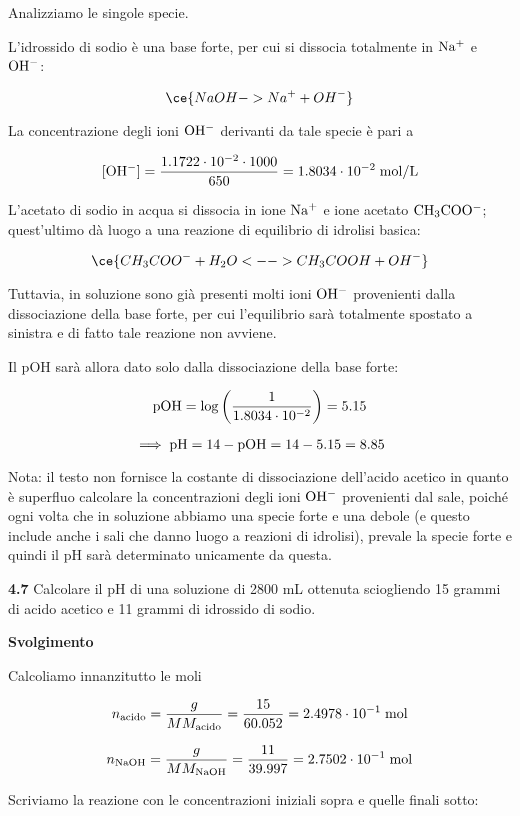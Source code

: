 Analizziamo le singole specie.

L'idrossido di sodio è una base forte, per cui si dissocia totalmente in $\rm Na^+$ e $\rm OH^-$:

$$\ce{NaOH -> Na^+ + OH^-}$$

La concentrazione degli ioni $\rm OH^-$ derivanti da tale specie è pari a

$$[\rm OH^-]=\frac{1.1722 \cdot 10^{-2} \cdot 1000}{650}=1.8034 \cdot 10^{-2} \; \rm mol/L$$

L'acetato di sodio in acqua si dissocia in ione $\rm Na^+$ e ione acetato $\rm CH_3COO^-$; quest'ultimo dà luogo a una reazione di equilibrio di idrolisi basica:

$$\ce{CH_3COO^- + H_2O <--> CH_3COOH + OH^-}$$

Tuttavia, in soluzione sono già presenti molti ioni $\rm OH^-$ provenienti dalla dissociazione della base forte, per cui l'equilibrio sarà totalmente spostato a sinistra e di fatto tale reazione non avviene.

Il pOH sarà allora dato solo dalla dissociazione della base forte:

$$\rm pOH=\log{\left(\frac{1}{1.8034 \cdot 10^{-2}}\right)}=5.15$$

$$\implies \rm pH=14-pOH=14-5.15=8.85$$

Nota: il testo non fornisce la costante di dissociazione dell'acido acetico in quanto è superfluo calcolare la concentrazioni degli ioni $\rm OH^-$ provenienti dal sale, poiché ogni volta che in soluzione abbiamo una specie forte e una debole (e questo include anche i sali che danno luogo a reazioni di idrolisi), prevale la specie forte e quindi il pH sarà determinato unicamente da questa.

\vspace{0.2cm}\textbf{4.7} Calcolare il pH di una soluzione di 2800 mL ottenuta sciogliendo 15 grammi di acido acetico e 11 grammi di idrossido di sodio.

\vspace{0.2cm}\large\textbf{Svolgimento}\normalsize

\vspace{0.2cm}Calcoliamo innanzitutto le moli

$$n_{\text{acido}}=\frac{g}{MM_{\text{acido}}}=\frac{15}{60.052}=2.4978 \cdot 10^{-1} \; \rm mol$$

$$n_{\text{NaOH}}=\frac{g}{MM_{\text{NaOH}}}=\frac{11}{39.997}=2.7502 \cdot 10^{-1} \; \rm mol$$

Scriviamo la reazione con le concentrazioni iniziali sopra e quelle finali sotto:

